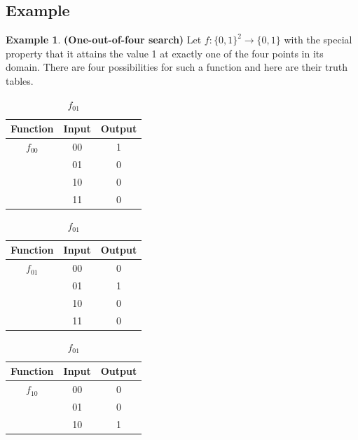 \documentclass[12pt, oneside]{book}
\theoremstyle{definition}
\theoremstyle{definition}
\newtheorem{example}{Example}[section]
\theoremstyle{remark}
\begin{document}
\subsection{Example}
\begin{example}
    \textbf{(One-out-of-four search)} Let $f:\{0,1\}^2 \rightarrow \{0,1\}$ with the special property that it attains the value 1 at exactly one of the four points in its domain. There are four possibilities for such a function and here are their truth tables.
    \begin{table}[H]
    \centering
     \begin{subtable}[b]{0.45\linewidth}
        \centering
          \begin{tabular}{|c|c|c|}
            \hline
             Function & Input & Output \\
            \hline
              $f_{00}$& 00 & 1 \\
              & 01 & 0 \\
              & 10 & 0 \\
              & 11 & 0 \\
             \hline
           \end{tabular}
           \caption{$f_{00}$}
        \end{subtable}%
     \begin{subtable}[b]{0.45\linewidth}
            \centering
            \begin{tabular}{|c|c|c|}
                \hline
                Function & Input & Output \\
                \hline
                $f_{01}$& 00 & 0 \\
              & 01 & 1 \\
              & 10 & 0 \\
              & 11 & 0 \\
                \hline
            \end{tabular}
            \caption{$f_{01}$}
        \end{subtable}
        \begin{subtable}[b]{0.45\linewidth}
            \centering
            \begin{tabular}{|c|c|c|}
                \hline
                Function & Input & Output \\
                \hline
                $f_{10}$& 00 & 0 \\
              & 01 & 0 \\
              & 10 & 1 \\

\end{tabular}
\end{subtable}
\end{table}
\end{example}
\end{document}
